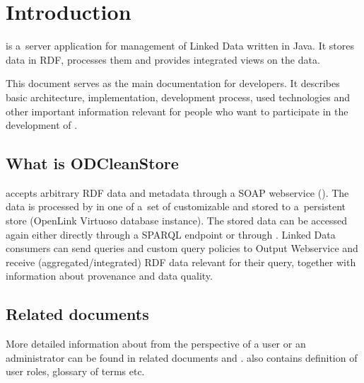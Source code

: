 
\newcommand{\version}{1.0.0}
\newcommand{\documentname}{\refprogrammersguide}

\hypersetup{pdftitle=ODCleanStore -- \documentname}





\renewcommand{\contentsname}{Contents}
\tableofcontents
\bigskip

\newpage




\chapter{Introduction}
\odcs is a~server application for management of Linked Data written in Java. It stores data in RDF, processes them and provides integrated views on the data.

This document serves as the main documentation for developers. It describes basic architecture, implementation, development process, used technologies and other important information relevant for people who want to participate in the development of \odcs.

\section{What is ODCleanStore}
\odcs accepts arbitrary RDF data and metadata through a SOAP webservice (). The data is processed by  in one of a~set of customizable  and stored to a~persistent store (OpenLink Virtuoso database instance). The stored data can be accessed again either  directly through a SPARQL endpoint or through . Linked Data consumers can send queries and custom query policies to Output Webservice and receive (aggregated/integrated) RDF data relevant for their query, together with information about provenance and data quality. 

\section{Related documents}
More detailed information about \odcs from the perspective of a user or an administrator can be found in related documents  and .  also contains definition of user roles, glossary of terms etc.

